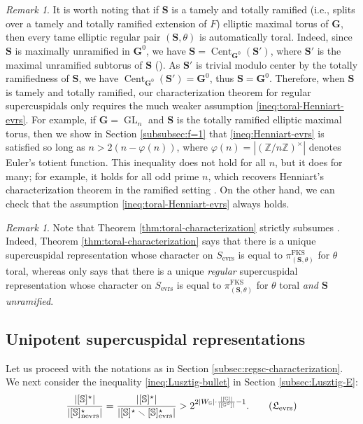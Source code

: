 \documentclass{amsart}
\newcommand{\evrs}{\mathrm{evrs}}
\newcommand{\nevrs}{\mathrm{nevrs}}
\newcommand{\FKS}{\mathrm{FKS}}
\newcommand{\bbS}{\mathbb{S}}
\newcommand{\bbG}{\mathbb{G}}
\newcommand{\bfG}{\mathbf{G}}
\newcommand{\bbZ}{\mathbb{Z}}
\newcommand{\bfS}{\mathbf{S}}
\DeclareMathOperator{\Cent}{Cent}
\DeclareMathOperator{\GL}{GL}
\theoremstyle{plain}
\theoremstyle{definition}
\theoremstyle{remark}
\newtheorem{rem}[thm]{Remark}
\theoremstyle{theorem}
\begin{document}
\begin{rem}\label{rem:toral-characterization}
It is worth noting that if $\bfS$ is a tamely and totally ramified (i.e., splits over a tamely and totally ramified extension of $F$) elliptic maximal torus of $\bfG$, then every tame elliptic regular pair $(\bfS,\theta)$ is automatically toral.
Indeed, since $\bfS$ is maximally unramified in $\bfG^{0}$, we have $\bfS=\Cent_{\bfG^{0}}(\bfS')$, where $\bfS'$ is the maximal unramified subtorus of $\bfS$ (\cite[Fact 3.4.1]{Kal19}).
As $\bfS'$ is trivial modulo center by the totally ramifiedness of $\bfS$, we have $\Cent_{\bfG^{0}}(\bfS')=\bfG^{0}$, thus $\bfS=\bfG^{0}$.
Therefore, when $\bfS$ is tamely and totally ramified, our characterization theorem for regular supercuspidals only requires the much weaker assumption \eqref{ineq:toral-Henniart-evrs}.
For example, if $\bfG = \GL_n$ and $\bfS$ is the totally ramified elliptic maximal torus, then we show in Section \ref{subsubsec:f=1} that \eqref{ineq:Henniart-evrs} is satisfied so long as $n > 2(n - \varphi(n))$, where $\varphi(n) = |(\bbZ/n\bbZ)^\times|$ denotes Euler's totient function. This inequality does not hold for all $n$, but it does for many; for example, it holds for all odd prime $n$, which recovers Henniart's characterization theorem in the ramified setting \cite[Section 8]{Hen93}.
On the other hand, we can check that the assumption \eqref{ineq:toral-Henniart-evrs} always holds.
\end{rem}

\begin{rem}\label{rem:strong toral characterization}
    Note that Theorem \ref{thm:toral-characterization} strictly subsumes \cite[Theorem 9.1]{CO21}. Indeed, Theorem \ref{thm:toral-characterization} says that there is a unique supercuspidal representation whose character on $S_{\evrs}$ is equal to $\pi_{(\bfS,\theta)}^{\FKS}$ for $\theta$ toral, whereas \cite[Theorem 9.1]{CO21} only says that there is a unique \textit{regular} supercuspidal representation whose character on $S_{\evrs}$ is equal to $\pi_{(\bfS,\theta)}^{\FKS}$ for $\theta$ toral \textit{and $\bfS$ unramified}. 
\end{rem}

\subsection{Unipotent supercuspidal representations}\label{subsec:unipsc-characterization}

Let us proceed with the notations as in Section \ref{subsec:regsc-characterization}.
We next consider the inequality \eqref{ineq:Lusztig-bullet} in Section \ref{subsec:Lusztig-E}:
\begin{equation*}\label{ineq:Lusztig-evrs}
\frac{|[\bbS]^{\star}|}{|[\bbS]^{\star}_{\nevrs}|}
=
\frac{|[\bbS]^{\star}|}{|[\bbS]^{\star} \smallsetminus [\bbS]^{\star}_{\evrs}|}
>
2^{2|W_{\bbG}|\cdot\frac{|[\bbG]|}{|[\bbG^{\circ}]|}-1}.
\tag{$\mathfrak{L}_{\evrs}$}
\end{equation*}
\end{document}
